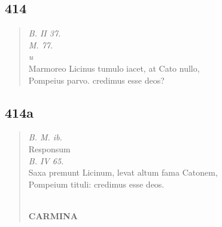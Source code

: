\documentclass[11pt, a4paper]{report}
\begin{document}
            \subsection*{414}
      \begin{verse}
      \textit{B. II 37.} \\ \textit{M. 77.} \\ \textit{u} \\ Marmoreo Licinus tumulo iacet, at Cato nullo, \\ Pompeius parvo. credimus esse deos? \\ 
      \end{verse}
  
            \subsection*{414a}
      \begin{verse}
      \textit{B. M. ib.} \\  \lbrack Responsum \rbrack  \\ \textit{B. IV 65.} \\ Saxa premunt Licinum, levat altum fama Catonem, \\ Pompeium tituli: credimus esse deos. \\ 
        ﻿\pagebreak 
     \marginpar{[320]} \begin{center} \textbf{CARMINA} \end{center}
      \end{verse}
  
\end{document}
